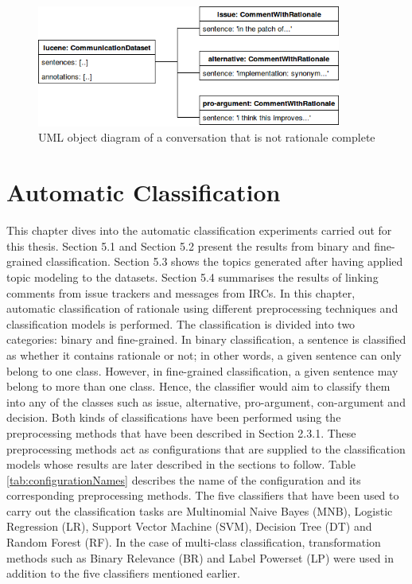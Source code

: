 \documentclass[a4paper,12pt,twoside]{report}
\begin{document}
\begin{figure}[H] %
    \centering
    \includegraphics[width=10cm]{rationale-incomplete}
    \caption{UML object diagram of a conversation that is not rationale complete}
    \label{fig:rationaleInComplete}
\end{figure}


\chapter{Automatic Classification}
This chapter dives into the automatic classification experiments carried out for this thesis. Section 5.1 and Section 5.2 present the results from binary and fine-grained classification. Section 5.3 shows the topics generated after having applied topic modeling to the datasets. Section 5.4 summarises the results of linking comments from issue trackers and messages from \acs{IRC}s.
\newline \newline
In this chapter, automatic classification of rationale using different preprocessing techniques and classification models is performed. The classification is divided into two categories: binary and fine-grained. In binary classification, a sentence is classified as whether it contains rationale or not; in other words, a given sentence can only belong to one class. However, in fine-grained classification, a given sentence may belong to more than one class. Hence, the classifier would aim to classify them into any of the classes such as issue, alternative, pro-argument, con-argument and decision. Both kinds of classifications have been performed using the preprocessing methods that have been described in Section 2.3.1. These preprocessing methods act as configurations that are supplied to the classification models whose results are later described in the sections to follow. Table \ref{tab:configurationNames} describes the name of the configuration and its corresponding preprocessing methods. The five classifiers that have been used to carry out the classification tasks are Multinomial Naive Bayes (\acs{MNB}), Logistic Regression (\acs{LR}), Support Vector Machine (\acs{SVM}), Decision Tree (\acs{DT}) and Random Forest (\acs{RF}). In the case of multi-class classification, transformation methods such as Binary Relevance (\acs{BR}) and Label Powerset (\acs{LP}) were used in addition to the five classifiers mentioned earlier. 
\end{document}
